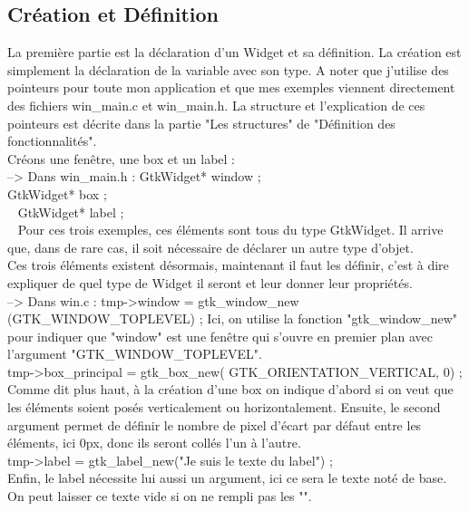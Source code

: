 \documentclass[11pt,french,a4paper]{report}
\begin{document}
        \subsection{Création et Définition}
La première partie est la déclaration d'un Widget et sa définition. La création est simplement la déclaration de la variable avec son type. A noter que j'utilise des pointeurs
pour toute mon application et que mes exemples viennent directement des fichiers win\_main.c et win\_main.h. La structure et l'explication de ces pointeurs est décrite
dans la partie "Les structures" de "Définition des fonctionnalités". \\
Créons une fenêtre, une box et un label : \\
--> Dans win\_main.h : 
GtkWidget* window ; \\ 
GtkWidget* box ;  \\ 
GtkWidget* label ; \\ 
Pour ces trois exemples, ces éléments sont tous du type GtkWidget. Il arrive que, dans de rare cas, il soit nécessaire de déclarer un autre type d'objet. \\ 

Ces trois éléments existent désormais, maintenant il faut les définir, c'est à dire expliquer de quel type de Widget il seront et leur donner leur propriétés. \\
--> Dans win\main.c : 
tmp->window = gtk\_window\_new (GTK\_WINDOW\_TOPLEVEL) ;
Ici, on utilise la fonction "gtk\_window\_new" pour indiquer que "window" est une fenêtre qui s'ouvre en premier plan avec l'argument "GTK\_WINDOW\_TOPLEVEL". \\

tmp->box\_principal = gtk\_box\_new( GTK\_ORIENTATION\_VERTICAL, 0) ;
Comme dit plus haut, à la création d'une box on indique d'abord si on veut que les éléments soient posés verticalement ou horizontalement. Ensuite, le second
argument permet de définir le nombre de pixel d'écart par défaut entre les éléments, ici 0px, donc ils seront collés l'un à l'autre.  \\
tmp->label = gtk\_label\_new("Je suis le texte du label") ; \\
Enfin, le label nécessite lui aussi un argument, ici ce sera le texte noté de base. On peut laisser ce texte vide si on ne rempli pas les "".  \\
\end{document}
